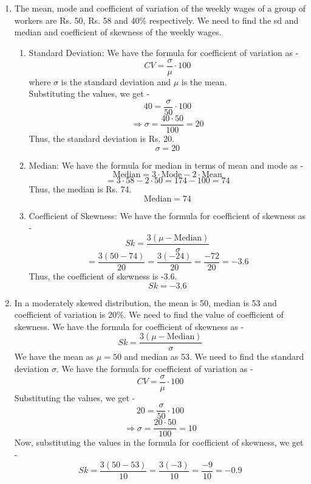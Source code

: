 \chapter{}
\begin{enumerate}
    \item The mean, mode and coefficient of variation of the weekly wages of a group of workers are Rs. 50, Rs. 58 and 40\% respectively. We need to find the sd and median and coefficient of skewness of the weekly wages.
    \begin{enumerate}
        \item Standard Deviation:
        We have the formula for coefficient of variation as -
        \[CV = \frac{\sigma}{\mu} \cdot 100\]
        where $\sigma$ is the standard deviation and $\mu$ is the mean. \\
        Substituting the values, we get -
        \[40 = \frac{\sigma}{50} \cdot 100\]
        \[\Rightarrow \sigma = \frac{40 \cdot 50}{100} = 20\]
        Thus, the standard deviation is Rs. 20.
        \[\boxed{\sigma = 20
        }\]
        \item Median:
        We have the formula for median in terms of mean and mode as -
        \[\text{Median} = 3 \cdot \text{Mode} - 2 \cdot \text{Mean}\]
        \[= 3 \cdot 58 - 2 \cdot 50
        = 174 - 100 = 74\]
        Thus, the median is Rs. 74.
        \[\boxed{\text{Median} = 74
        }\]
        \item Coefficient of Skewness:
        We have the formula for coefficient of skewness as -
        \[Sk = \frac{3(\mu - \text{Median})}{\sigma}\]
        \[= \frac{3(50 - 74)}{20} = \frac{3(-24)}{20} = \frac{-72}{20} = -3.6\]
        Thus, the coefficient of skewness is -3.6.
        \[\boxed{Sk = -3.6
        }\]
    \end{enumerate}
    \item In a moderately skewed distribution, the mean is 50, median is 53 and coefficient of variation is 20\%. We need to find the value of coefficient of skewness.
    We have the formula for coefficient of skewness as -
    \[Sk = \frac{3(\mu - \text{Median})}{\sigma}\]
    We have the mean as $\mu = 50$ and median as 53. We need to find the standard deviation $\sigma$. We have the formula for coefficient of variation as -
    \[CV = \frac{\sigma}{\mu} \cdot 100\]
    Substituting the values, we get -
    \[20 = \frac{\sigma}{50} \cdot 100\]
    \[\Rightarrow \sigma = \frac{20 \cdot 50}{100} = 10\]
    Now, substituting the values in the formula for coefficient of skewness, we get -
    \[Sk = \frac{3(50 - 53)}{10} = \frac{3(-3)}{10} = \frac{-9}{10} = -0.9\]

\end{enumerate}
